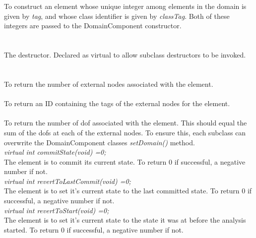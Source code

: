   \\
  \\
To construct an element whose unique integer among elements in the
domain is given by {\em tag}, and whose class identifier is given
by {\em classTag}. Both of these integers are passed to the
DomainComponent constructor. \\

 \\
\\ 
The destructor. Declared as virtual to allow subclass destructors to
be invoked. \\

  \\
 \\
To return the number of external nodes associated with the element. \\

 \\
To return an ID containing the tags of the external nodes for the element. \\

\\
To return the number of dof associated with the element. This should
equal the sum of the dofs at each of the external nodes. To ensure
this, each subclass can overwrite the DomainComponent classes {\em
setDomain()} method.\\ 

{\em virtual int commitState(void) =0;} \\
The element is to commit its current state. To return $0$ if
successful, a negative number if not. \\

{\em virtual int revertToLastCommit(void) =0;} \\
The element is to set it's current state to the last committed
state. To return $0$ if successful, a negative number if not. \\

{\em virtual int revertToStart(void) =0;} \\
The element is to set it's current state to the state it was at before
the analysis started. To return $0$ if successful, a negative number
if not. \\ 

